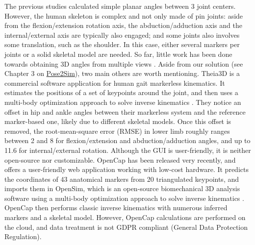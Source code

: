 The previous studies calculated simple planar angles between 3 joint centers. However, the human skeleton is complex and not only made of pin joints: aside from the flexion/extension rotation axis, the abduction/adduction axis and the internal/external axis are typically also engaged; and some joints also involves some translation, such as the shoulder. In this case, either several markers per joints or a solid skeletal model are needed. So far, little work has been done towards obtaining 3D angles from multiple views \cite{Zheng2022}. Aside from our solution (see Chapter 3 on \hyperref[ch:3]{Pose2Sim}), two main others are worth mentioning. Theia3D is a commercial software application for human gait markerless kinematics. It estimates the positions of a set of keypoints around the joint, and then uses a multi-body optimization approach to solve inverse kinematics \cite{Kanko2021a,Kanko2021b}. They notice an offset in hip and ankle angles between their markerless system and the reference marker-based one, likely due to different skeletal models. Once this offset is removed, the root-mean-square error (RMSE) in lower limb roughly ranges between 2 and 8\degree{} for flexion/extension and abduction/adduction angles, and up to 11.6\degree{} for internal/external rotation. Although the GUI is user-friendly, it is neither open-source nor customizable. OpenCap \cite{Uhlrich2022} has been released very recently, and offers a user-friendly web application working with low-cost hardware. It predicts the coordinates of 43 anatomical markers from 20 triangulated keypoints, and imports them in OpenSim, which is an open-source biomechanical 3D analysis software using a multi-body optimization approach to solve inverse kinematics \cite{Delp2007,Seth2018}. OpenCap then performs classic inverse kinematics with numerous inferred markers and a skeletal model. However, OpenCap calculations are performed on the cloud, and data treatment is not GDPR compliant (General Data Protection Regulation).

